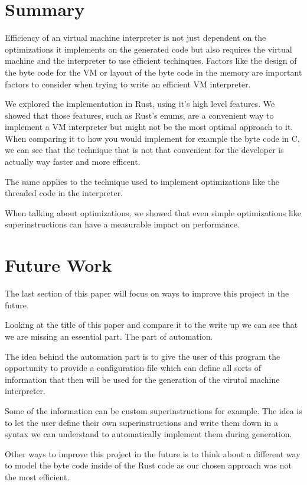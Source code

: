 \documentclass{article}
\begin{document}
\section{Summary}
Efficiency of an virtual machine interpreter is not just dependent on the
optimizations it implements on the generated code but also requires the virtual
machine and the interpreter to use efficient techinques. Factors like the
design of the byte code for the VM or layout of the byte code in the memory are
important factors to consider when trying to write an efficient VM interpreter.

We explored the implementation in Rust, using it's high level features. We
showed that those features, such as Rust's enums, are a convenient way to
implement a VM interpreter but might not be the most optimal approach to it.
When comparing it to how you would implement for example the byte code in C, we
can see that the technique that is not that convenient for the developer is
actually way faster and more efficent.

The same applies to the technique used to implement optimizations like the
threaded code in the interpreter.

When talking about optimizations, we showed that even simple optimizations
like superinstructions can have a measurable impact on performance. 

\section{Future Work}
\label{sec:future}
The last section of this paper will focus on ways to improve this project
in the future.

Looking at the title of this paper and compare it to the write up we can see
that we are missing an essential part. The part of automation.

The idea behind the automation part is to give the user of this program
the opportunity to provide a configuration file which can define all 
sorts of information that then will be used for the generation of the
virutal machine interpreter.

Some of the information can be custom superinstructions for example. The idea
is to let the user define their own superinstructions and write them down in a
syntax we can understand to automatically implement them during generation.

Other ways to improve this project in the future is to think about a different
way to model the byte code inside of the Rust code as our chosen approach was
not the most efficient. 
\end{document}
